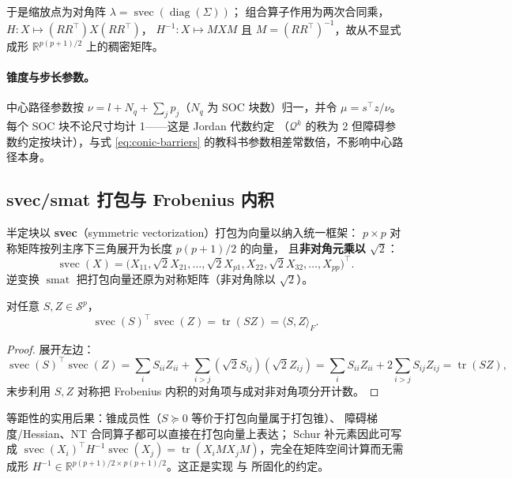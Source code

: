 于是缩放点为对角阵 $\lambda = \operatorname{svec}(\operatorname{diag}(\Sigma))$；
组合算子作用为两次合同乘，$H : X \mapsto (RR^\top) X (RR^\top)$，
$H^{-1} : X \mapsto MXM$ 且 $M = (RR^\top)^{-1}$，故从不显式成形
$\mathbb{R}^{p(p+1)/2}$ 上的稠密矩阵。

\paragraph{锥度与步长参数。}中心路径参数按
$\nu = l + N_q + \sum_j p_j$（$N_q$ 为 SOC 块数）归一，并令
$\mu = s^\top z / \nu$。每个 SOC 块不论尺寸均计 1——这是 Jordan 代数约定
（$\mathcal{Q}^k$ 的秩为 2 但障碍参数约定按块计），与式
\eqref{eq:conic-barriers} 的教科书参数相差常数倍，不影响中心路径本身。

\subsection{svec/smat 打包与 Frobenius 内积}

半定块以 \textbf{svec}（symmetric vectorization）打包为向量以纳入统一框架：
$p \times p$ 对称矩阵按列主序下三角展开为长度 $p(p+1)/2$ 的向量，
且\textbf{非对角元乘以 $\sqrt 2$}：
\begin{equation}
\label{eq:svec}
\operatorname{svec}(X) = \big(X_{11}, \sqrt2 X_{21}, \ldots, \sqrt2 X_{p1},
X_{22}, \sqrt2 X_{32}, \ldots, X_{pp}\big)^\top .
\end{equation}
逆变换 $\operatorname{smat}$ 把打包向量还原为对称矩阵（非对角除以 $\sqrt 2$）。

\begin{proposition}
\label{prop:svec-isometry}
对任意 $S, Z \in \mathcal{S}^p$，
\[
\operatorname{svec}(S)^\top \operatorname{svec}(Z) = \operatorname{tr}(SZ)
= \langle S, Z \rangle_F .
\]
\end{proposition}
\begin{proof}
展开左边：
\[
\operatorname{svec}(S)^\top \operatorname{svec}(Z)
= \sum_{i} S_{ii} Z_{ii} + \sum_{i > j} (\sqrt2 S_{ij})(\sqrt2 Z_{ij})
= \sum_i S_{ii}Z_{ii} + 2\sum_{i>j} S_{ij}Z_{ij}
= \operatorname{tr}(SZ),
\]
末步利用 $S, Z$ 对称把 Frobenius 内积的对角项与成对非对角项分开计数。
\end{proof}

\begin{remark}
等距性的实用后果：锥成员性（$S \succeq 0$ 等价于打包向量属于打包锥）、
障碍梯度/Hessian、NT 合同算子都可以直接在打包向量上表达；
Schur 补元素因此可写成
$\operatorname{svec}(X_i)^\top H^{-1} \operatorname{svec}(X_j)
= \operatorname{tr}(X_i M X_j M)$，完全在矩阵空间计算而无需成形
$H^{-1} \in \mathbb{R}^{p(p+1)/2 \times p(p+1)/2}$。这正是实现
 与
 所固化的约定。
\end{remark}

